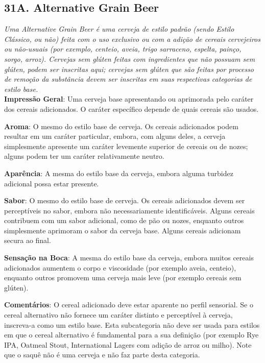 \subsection*{31A. Alternative Grain Beer}
\textit{Uma Alternative Grain Beer é uma cerveja de estilo padrão (sendo Estilo Clássico, ou não) feita com o uso exclusivo ou com a adição de cereais cervejeiros ou não-usuais (por exemplo, centeio, aveia, trigo sarraceno, espelta, painço, sorgo, arroz). Cervejas sem glúten feitas com ingredientes que não possuam sem glúten, podem ser inscritas aqui; cervejas sem glúten que são feitas por processo de remoção da substância devem ser inscritas em suas respectivas categorias de estilo base.}\\
\textbf{Impressão Geral}: Uma cerveja base apresentando ou aprimorada pelo caráter dos cereais adicionados. O caráter específico depende de quais cereais são usados.

\textbf{Aroma}: O mesmo do estilo base de cerveja. Os cereais adicionados podem resultar em um caráter particular, embora, com alguns deles, a cerveja simplesmente apresente um caráter levemente superior de cereais ou de nozes; alguns podem ter um caráter relativamente neutro.

\textbf{Aparência}: A mesma do estilo base da cerveja, embora alguma turbidez adicional possa estar presente.

\textbf{Sabor}: O mesmo do estilo base de cerveja. Os cereais adicionados devem ser perceptíveis no sabor, embora não necessariamente identificáveis. Alguns cereais contribuem com um sabor adicional, como de pão ou nozes, enquanto outros simplesmente aprimoram o sabor da cerveja base. Alguns cereais adicionam secura ao final.

\textbf{Sensação na Boca}: A mesma do estilo base da cerveja, embora muitos cereais adicionados aumentem o corpo e viscosidade (por exemplo aveia, centeio), enquanto outros promovem uma cerveja mais leve (por exemplo cereais sem glúten).

\textbf{Comentários}: O cereal adicionado deve estar aparente no perfil sensorial. Se o cereal alternativo não fornece um caráter distinto e perceptível à cerveja, inscreva-a como um estilo base. Esta subcategoria não deve ser usada para estilos em que o cereal alternativo é fundamental para a sua definição (por exemplo Rye IPA, Oatmeal Stout, International Lagers com adição de arroz ou milho). Note que o saquê não é uma cerveja e não faz parte desta categoria.

